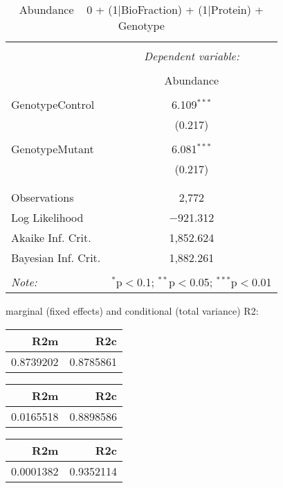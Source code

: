 \documentclass[11pt]{report}
\begin{document}
\begin{table}[!htbp] \centering 
  \caption{Abundance ~ 0 + (1|BioFraction) + (1|Protein) + Genotype} 
  \label{} 
\begin{tabular}{@{\extracolsep{5pt}}lc} 
\\[-1.8ex]\hline 
\hline \\[-1.8ex] 
 & \multicolumn{1}{c}{\textit{Dependent variable:}} \\ 
\cline{2-2} 
\\[-1.8ex] & Abundance \\ 
\hline \\[-1.8ex] 
 GenotypeControl & 6.109$^{***}$ \\ 
  & (0.217) \\ 
  & \\ 
 GenotypeMutant & 6.081$^{***}$ \\ 
  & (0.217) \\ 
  & \\ 
\hline \\[-1.8ex] 
Observations & 2,772 \\ 
Log Likelihood & $-$921.312 \\ 
Akaike Inf. Crit. & 1,852.624 \\ 
Bayesian Inf. Crit. & 1,882.261 \\ 
\hline 
\hline \\[-1.8ex] 
\textit{Note:}  & \multicolumn{1}{r}{$^{*}$p$<$0.1; $^{**}$p$<$0.05; $^{***}$p$<$0.01} \\ 
\end{tabular} 
\end{table} 
marginal (fixed effects) and conditional (total variance) R2:

\begin{tabular}{r|r}
\hline
R2m & R2c\\
\hline
0.8739202 & 0.8785861\\
\hline
\end{tabular}

\begin{tabular}{r|r}
\hline
R2m & R2c\\
\hline
0.0165518 & 0.8898586\\
\hline
\end{tabular}

\begin{tabular}{r|r}
\hline
R2m & R2c\\
\hline
0.0001382 & 0.9352114\\
\hline
\end{tabular}
\end{document}
